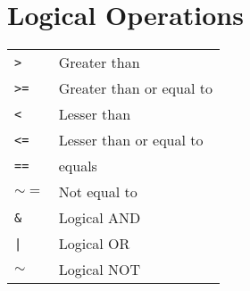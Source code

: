 \section{Logical Operations}
\begin{tabular}{@{}p{\the\MyLenA}%
		@{}p{\linewidth-\the\MyLenA}}
  \texttt{>} & Greater than\\
  \texttt{>=}& Greater than or equal to\\
  \texttt{<}& Lesser than\\
  \texttt{<=} & Lesser than or equal to\\
  \texttt{==} & equals\\
  $\sim =$ & Not equal to\\
  \texttt{\&} & Logical AND\\
  \texttt{|} & Logical OR\\
  $\sim$ & Logical NOT\\
\end{tabular}